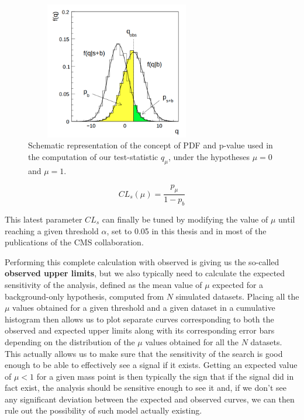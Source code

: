 \documentclass[a4paper, 10pt, openright]{report}
\begin{document}
\begin{figure}[htbp]
\centering
\includegraphics[width=8cm, height=6cm]{figs/stat.png}
\caption{Schematic representation of the concept of \ac{PDF} and p-value used in the computation of our test-statistic $q_\mu$, under the hypotheses $\mu = 0$ and $\mu = 1$.}
\label{fig:stat}
\end{figure}

\begin{equation}
\label{eq:CL}
CL_s(\mu) = \frac{p_\mu}{1-p_b}
\end{equation}

This latest parameter $CL_s$ can finally be tuned by modifying the value of $\mu$ until reaching a given threshold $\alpha$, set to 0.05 in this thesis and in most of the publications of the \ac{CMS} collaboration.

Performing this complete calculation with observed is giving us the so-called \textbf{observed upper limits}, but we also typically need to calculate the expected sensitivity of the analysis, defined as the mean value of $\mu$ expected for a background-only hypothesis, computed from $N$ simulated datasets. Placing all the $\mu$ values obtained for a given threshold and a given dataset in a cumulative histogram then allows us to plot separate curves corresponding to both the observed and expected upper limits along with its corresponding error bars depending on the distribution of the $\mu$ values obtained for all the $N$ datasets. This actually allows us to make sure that the sensitivity of the search is good enough to be able to effectively see a signal if it exists. Getting an expected value of $\mu < 1$ for a given mass point is then typically the sign that if the signal did in fact exist, the analysis should be sensitive enough to see it and, if we don't see any significant deviation between the expected and observed curves, we can then rule out the possibility of such model actually existing.
\end{document}
